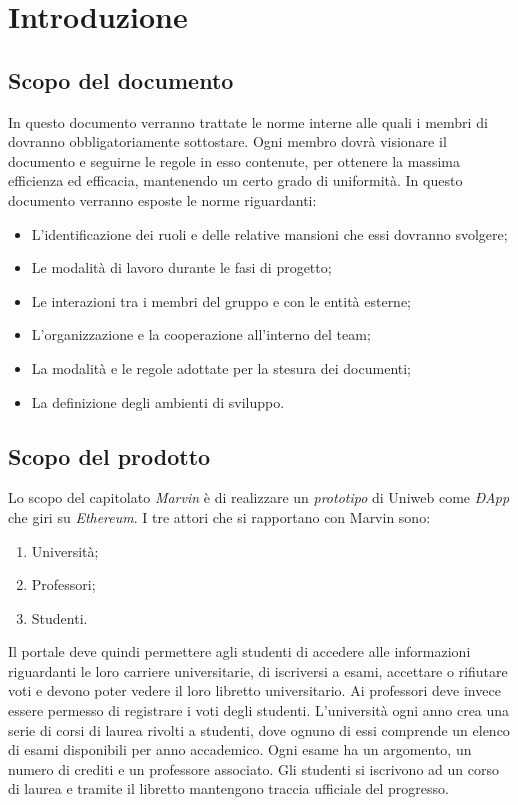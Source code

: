 \newpage
\section{Introduzione}

\subsection{Scopo del documento}
In questo documento verranno trattate le norme interne alle quali i membri di \gruppo{} dovranno obbligatoriamente sottostare. Ogni membro dovrà visionare il documento e seguirne le regole in esso contenute, per ottenere la massima efficienza ed efficacia, mantenendo un certo grado di uniformità.
\newline In questo documento verranno esposte le norme riguardanti:
\begin{itemize}
	\item L'identificazione dei ruoli e delle relative mansioni che essi dovranno svolgere;
	\item Le modalità di lavoro durante le fasi di progetto;
	\item Le interazioni tra i membri del gruppo e con le entità esterne;
	\item L'organizzazione e la cooperazione all'interno del team;
	\item La modalità e le regole adottate per la stesura dei documenti;
	\item La definizione degli ambienti di sviluppo.
\end{itemize}
\subsection{Scopo del prodotto}
Lo scopo del capitolato \emph{Marvin} è di realizzare un \textit{prototipo} di Uniweb come \textit{ÐApp} che giri su \textit{Ethereum}. I tre attori che si rapportano con Marvin sono:
\begin{enumerate}
	\item Università;
	\item Professori;
	\item Studenti.
\end{enumerate}
Il portale deve quindi permettere agli studenti di accedere alle informazioni riguardanti le loro carriere universitarie, di iscriversi a esami, accettare o rifiutare voti e devono poter vedere il loro libretto universitario.
\newline Ai professori deve invece essere permesso di registrare i voti degli studenti.
\newline L'università ogni anno crea una serie di corsi di laurea rivolti a studenti, dove  ognuno di essi comprende un elenco di esami disponibili per anno accademico. Ogni esame ha un argomento, un numero di crediti e un professore associato.
\newline Gli studenti si iscrivono ad un corso di laurea e tramite il libretto mantengono traccia ufficiale del progresso.
